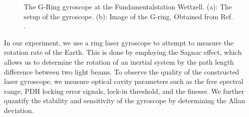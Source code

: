 \documentclass[a4paper]{report}
\numberwithin{equation}{section}
\begin{document}
\begin{figure}[h!]
	\centering
	\quad
	\centering
	\caption{The G-Ring gyroscope at the Fundamentalstation Wettzell. (a):
	The setup of the gyroscope. (b): Image of the G-ring. Obtained from Ref. \cite{Wettzell2005}.}
	\label{fig:gring_gyro}
\end{figure}



In our experiment, we use a ring laser gyroscope to attempt to measure the rotation rate of the Earth. This is done by employing the Sagnac effect,
which allows us to determine the rotation of an inertial system by the path length difference between two light beams. To observe
the quality of the constructed laser gyroscope, we measure optical cavity parameters such as the free spectral range,
PDH locking error signals, lock-in threshold, and the finesse. We further quantify the stability and sensitivity of the gyroscope by 
determining the Allan deviation. \par 
\end{document}

